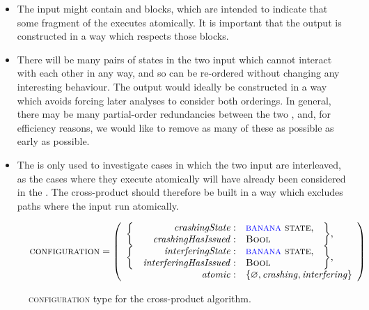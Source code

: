 \begin{itemize}
\item The input {\StateMachines} might contain  and
   blocks, which are intended to indicate that some
  fragment of the {\StateMachine} executes atomically.  It is
  important that the output {\StateMachine} is constructed in a way
  which respects those blocks.
\item There will be many pairs of states in the two input
  {\StateMachines} which cannot interact with each other in any way,
  and so can be re-ordered without changing any interesting behaviour.
  The output {\StateMachine} would ideally be constructed in a way
  which avoids forcing later analyses to consider both orderings.  In
  general, there may be many partial-order redundancies\needCite{}
  between the two {\StateMachines}, and, for efficiency reasons, we
  would like to remove as many of these as possible as early as
  possible.
\item The  is only used to investigate
  cases in which the two input {\StateMachines} are interleaved, as
  the cases where they execute atomically will have already been
  considered in the .  The cross-product
  {\StateMachine} should therefore be built in a way which excludes
  paths where the input {\StateMachines} run atomically.
\end{itemize}

\begin{figure}
  \begin{displaymath}
    \textsc{configuration} = \left(\begin{array}{rrll}
      \multirow{2}{*}{\bigg\{} & \mathit{crashingState}: & \textsc{{\StateMachine} state}, & \multirow{2}{*}{\bigg\},}\\
                               & \mathit{crashingHasIssued}: & \textsc{Bool}\\
      \multirow{2}{*}{\bigg\{} & \mathit{interferingState}: & \textsc{{\StateMachine} state}, & \multirow{2}{*}{\bigg\},} \\
                               & \mathit{interferingHasIssued}: & \textsc{Bool}\\
      \multicolumn{2}{r}{\mathit{atomic}:} & \multicolumn{2}{l}{\{ \varnothing, \mathit{crashing}, \mathit{interfering} \}}
    \end{array}\right)
  \end{displaymath}
  \caption{\textsc{configuration} type for the cross-product algorithm.}
  \label{fig:cross_product:configuration}
\end{figure}

